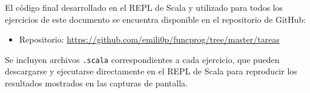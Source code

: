 \documentclass[12pt]{article}
\begin{document}
El código final desarrollado en el REPL de Scala y utilizado para todos los ejercicios de este documento se encuentra disponible en el repositorio de GitHub:

\begin{itemize}
    \item Repositorio: \href{https://github.com/emili0p/funcprog/tree/master/tareas}{https://github.com/emili0p/funcprog/tree/master/tareas}
\end{itemize}

\noindent
Se incluyen archivos \texttt{.scala} correspondientes a cada ejercicio, que pueden descargarse y ejecutarse directamente en el REPL de Scala para reproducir los resultados mostrados en las capturas de pantalla.
\end{document}
